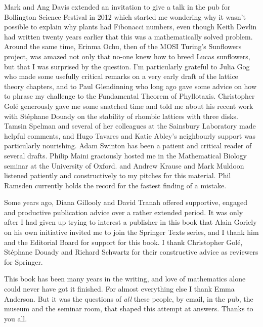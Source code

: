 


Mark and Ang Davis extended an invitation to give a talk in the pub for Bollington Science Festival in 2012 which started me wondering why it wasn't possible to explain why plants had Fibonacci numbers, even though Keith Devlin had written twenty years earlier that this was a mathematically solved problem. Around the same time, Erinma Ochu, then of the MOSI Turing's Sunflowers project, was amazed not only that no-one knew how to breed Lucas sunflowers, but that I was surprised by the question.  
I'm particularly grateful to Julia Gog who made some usefully critical remarks on a very early draft of the lattice theory chapters, and to Paul Glendinning who long ago gave some advice on how to phrase my challenge to the Fundamental Theorem of Phyllotaxis.
Christopher Golé generously gave me some snatched time and told me about his recent work with Stéphane Douady on the stability of rhombic lattices with three disks. Tamsin Spelman and several of her colleagues at the Sainsbury Laboratory made helpful comments, and Hugo Tavares and Katie Abley's neighbourly support was particularly nourishing. Adam Swinton has been a patient and critical reader of several drafts.   Philip Maini graciously hosted me in the Mathematical Biology seminar at the University of Oxford. and Andrew Krause and Mark Muldoon listened patiently and constructively to my pitches for this material. Phil Ramsden currently holds the record for the fastest finding of a mistake.  

Some years ago,  Diana Gillooly and David Tranah offered supportive, engaged and productive publication advice over a rather extended period. It was only after I had given up trying to interest a publisher in this book that Alain Goriely on his own initiative invited me to join the Springer Texts series, and I thank him and the Editorial Board for support for this book. I thank Christopher Golé, Stéphane Douady and Richard Schwartz for their constructive advice as reviewers for Springer. 


This book has been many years in the writing, and love of mathematics alone could never have got it finished. For almost everything else I thank Emma Anderson. But it was the questions of \textit{all} these people, by email, in the pub, the museum and the seminar room, that shaped this attempt at answers.  Thanks to you all. 


